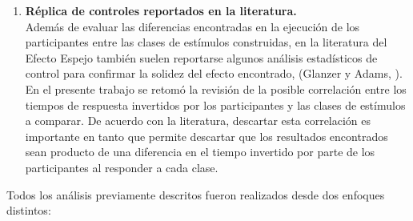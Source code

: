 \begin{enumerate}
\item \textbf{Réplica de controles reportados en la literatura.}\\

Además de evaluar las diferencias encontradas en la ejecución de los participantes entre las clases de estímulos construidas, en la literatura del Efecto Espejo también suelen reportarse algunos análisis estadísticos de control para confirmar la solidez del efecto encontrado, (Glanzer y Adams, \citeyear{Glanzer1990}). En el presente trabajo se retomó la revisión de la posible correlación entre los tiempos de respuesta invertidos por los participantes y las clases de estímulos a comparar. De acuerdo con la literatura, descartar esta correlación es importante en tanto que permite descartar que los resultados encontrados sean producto de una diferencia en el tiempo invertido por parte de los participantes al responder a cada clase.\\
\end{enumerate}

Todos los análisis previamente descritos fueron realizados desde dos enfoques distintos:\\


